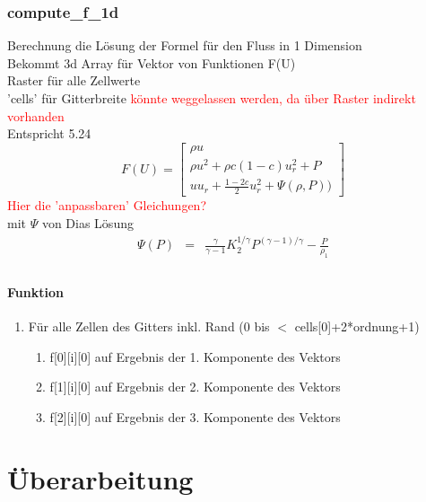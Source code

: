 \documentclass[12pt]{article}
\begin{document}
\subsubsection{compute\_f\_1d}
Berechnung die Lösung der Formel für den Fluss in 1 Dimension\\
Bekommt 3d Array für Vektor von Funktionen F(U) \\
Raster für alle Zellwerte\\
'cells' für Gitterbreite \textcolor{red}{könnte weggelassen werden, da über Raster indirekt vorhanden}\\
Entspricht 5.24
\begin{equation}
F(U) = \left[\begin{array}{c}\rho u \\[2mm] 
\rho u^2 + \rho c (1-c) u_r^2 + P\\[2mm] 
uu_r + \frac{1-2c}{2} u_r^2 + \Psi(\rho,P))\end{array}\right]
\end{equation}
\textcolor{red}{Hier die 'anpassbaren' Gleichungen?}\\
mit $\Psi$ von Dias Lösung\\
\begin{eqnarray*}
	\Psi(P) &=& \frac{\gamma}{\gamma-1} K_2^{1/\gamma} P^{(\gamma-1)/\gamma} -
	\frac{P}{\rho_1}\\
\end{eqnarray*}
\renewcommand{\labelenumi}{\alph{enumi})} 
\paragraph{Funktion}
\begin{enumerate}
	\item Für alle Zellen des Gitters inkl. Rand (0 bis $<$ cells[0]+2*ordnung+1)
	\begin{enumerate}
		\item f[0][i][0] auf Ergebnis der 1. Komponente des Vektors
		\item f[1][i][0] auf Ergebnis der 2. Komponente des Vektors
		\item f[2][i][0] auf Ergebnis der 3. Komponente des Vektors
	\end{enumerate}
\end{enumerate}

\section{Überarbeitung}
\end{document}
